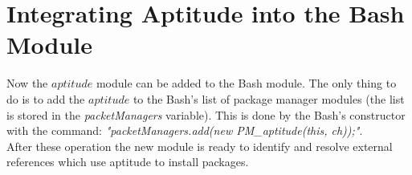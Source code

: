\section{Integrating Aptitude into the Bash Module}\label{sec:aptitude_int}
Now the $aptitude$ module can be added to the Bash module.
The only thing to do is to add the $aptitude$ to the Bash's list of package manager modules (the list is stored in the \emph{packetManagers} variable).
This is done by the Bash's constructor with the command: \emph{"packetManagers.add(new PM\_aptitude(this, ch));"}.\\
After these operation the new module is ready to identify and resolve external references which use aptitude to install packages.